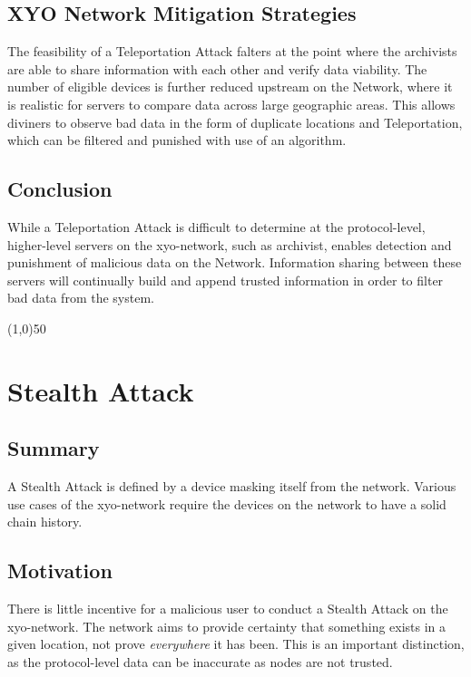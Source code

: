 \documentclass{article}
\begin{document}
\subsection{XYO Network Mitigation Strategies}
The feasibility of a Teleportation Attack falters at the point where the \Glspl{archivist} are able to share information with each other and verify data viability. The number of eligible devices is further reduced upstream on the Network, where it is realistic for servers to compare data across large geographic areas. This allows \Glspl{diviner} to observe bad data in the form of duplicate locations and Teleportation, which can be filtered and punished with use of an algorithm. 

\subsection{Conclusion}
While a Teleportation Attack is difficult to determine at the protocol-level, higher-level servers on the \Gls{xyo-network}, such as \Gls{archivist}, enables detection and punishment of malicious data on the Network. Information sharing between these servers will continually build and append trusted information in order to filter bad data from the system.

\begin{center}
\line(1,0){50}
\end{center}

\section{Stealth Attack}
\subsection{Summary}
A Stealth Attack is defined by a device masking itself from the network. Various use cases of the \Gls{xyo-network} require the devices on the network to have a solid chain history. 

\subsection{Motivation}
There is little incentive for a malicious user to conduct a Stealth Attack on the \Gls{xyo-network}. The network aims to provide certainty that something exists in a given location, not prove \textit{everywhere} it has been. This is an important distinction, as the protocol-level data can be inaccurate as nodes are not trusted.
\end{document}
